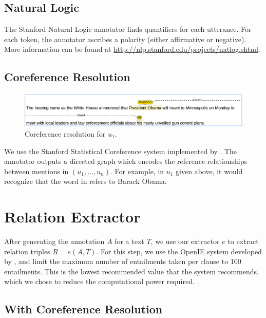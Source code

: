 \subsection{Natural Logic}
The Stanford Natural Logic annotator finds
quantifiers for each utterance. For each token,
the annotator ascribes a polarity (either affirmative
or negative).
More information can be found at 
\url{http://nlp.stanford.edu/projects/natlog.shtml}.
\subsection{Coreference Resolution}

\begin{figure}
\includegraphics[scale=0.33]{figures/coref.png}
\caption{
\label{fig:coref}
Coreference resolution for $u_1$.
}
\end{figure}

We use the Stanford Statistical Coreference system implemented by
\citet{clark2015coref}. The annotator outputs a directed graph
which encodes the reference relationships between mentions in 
$(u_1,\dots,u_n)$. For example, in $u_1$ given above, it would
recognize that the word  in 
refers to Barack Obama.

\section{Relation Extractor}
After generating the annotation $A$ for a text $T$, we use our 
extractor $e$ to extract relation triples $R=e(A,T)$. For this 
step, we use the OpenIE system developed by \citet{angeli2015openie}, and
limit the maximum number of entailments taken per clause to 100 entailments.
This is the lowest recommended value that the system recommends, which we
chose to reduce the computational power required.
.

\subsection{With Coreference Resolution}


\citet{fader11reverb}
